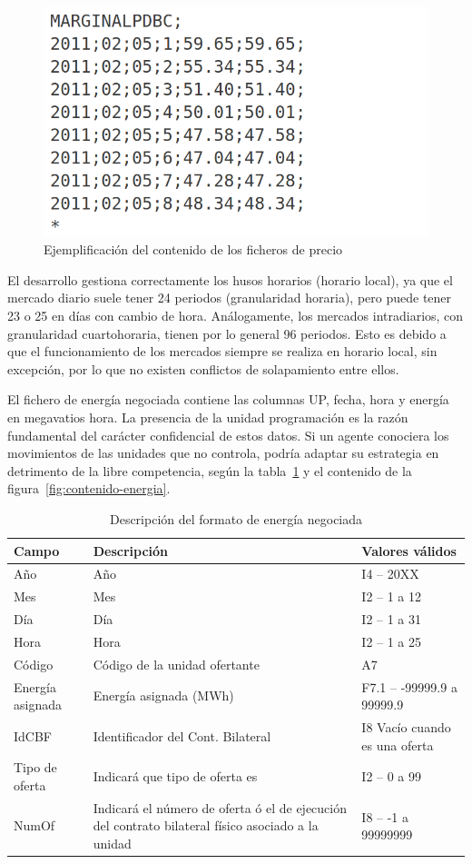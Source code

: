 \begin{figure}
  \centering
  \includegraphics[width=0.5\linewidth]{figures/contenido-precio.png}
  \caption{Ejemplificación del contenido de los ficheros de precio}
  \label{fig:contenido-precio}
\end{figure}

El desarrollo gestiona correctamente los husos horarios (horario local), ya que el mercado diario suele tener 24 periodos (granularidad horaria), pero puede tener 23 o 25 en días con cambio de hora. Análogamente, los mercados intradiarios, con granularidad cuartohoraria, tienen por lo general 96 periodos. Esto es debido a que el funcionamiento de los mercados siempre se realiza en horario local, sin excepción, por lo que no existen conflictos de solapamiento entre ellos.

El fichero de energía negociada contiene las columnas UP, fecha, hora y energía en megavatios hora. La presencia de la unidad programación es la razón fundamental del carácter confidencial de estos datos. Si un agente conociera los movimientos de las unidades que no controla, podría adaptar su estrategia en detrimento de la libre competencia, según la tabla~\ref{tab:descripción-energia} y el contenido de la figura~\ref{fig:contenido-energia}.

\begin{table}[ht]
  \centering
  \begin{tabular}{|l|p{5cm}|l|}
    \hline
    Campo & Descripción & Valores válidos\\
    \hline
    Año & Año & I4 -- 20XX\\
    Mes & Mes & I2 -- 1 a 12\\
    Día & Día & I2 -- 1 a 31\\
    Hora & Hora & I2 -- 1 a 25\\
    Código & Código de la unidad ofertante & A7\\
    Energía asignada & Energía asignada (MWh) & F7.1 – -99999.9 a 99999.9\\
    IdCBF & Identificador del Cont. Bilateral & I8 Vacío cuando es una oferta\\
    Tipo de oferta & Indicará que tipo de oferta es & I2 – 0 a 99\\
    NumOf & Indicará el número de oferta ó el de ejecución del contrato bilateral físico asociado a la unidad & I8 – -1 a 99999999\\
    \hline
  \end{tabular}
  \caption{Descripción del formato de energía negociada}
  \label{tab:descripción-energia}
\end{table}

